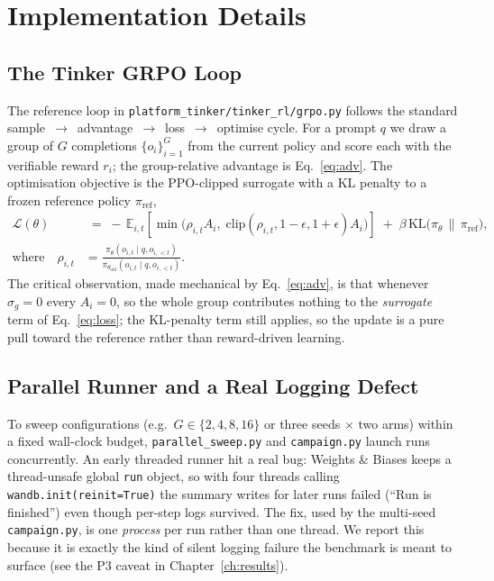 \chapter{Implementation Details}
\label{ch:impl}

\section{The Tinker GRPO Loop}
\label{sec:impl-loop}


The reference loop in \texttt{platform\_\-tinker/\allowbreak tinker\_\-rl/\allowbreak grpo.py} follows the standard
sample~$\rightarrow$~advantage~$\rightarrow$~loss~$\rightarrow$~optimise cycle. For a
prompt $q$ we draw a group of $G$ completions $\{o_i\}_{i=1}^{G}$ from the current
policy and score each with the verifiable reward $r_i$; the group-relative advantage
is Eq.~\eqref{eq:adv}. The optimisation objective is the PPO-clipped surrogate with
a KL penalty to a frozen reference policy $\pi_{\mathrm{ref}}$,
\begin{align}
\mathcal{L}(\theta) &\;=\;
-\,\mathbb{E}_{i,t}\!\left[
\min\!\big(\rho_{i,t}A_i,\;
\mathrm{clip}(\rho_{i,t},1-\epsilon,1+\epsilon)A_i\big)
\right]
\;+\; \beta\, \mathrm{KL}\!\big(\pi_\theta \,\|\, \pi_{\mathrm{ref}}\big),
\label{eq:loss}\\[0.2em]
\text{where}\quad
\rho_{i,t} &=\frac{\pi_\theta(o_{i,t}\mid q,o_{i,<t})}{\pi_{\theta_{\mathrm{old}}}(o_{i,t}\mid q,o_{i,<t})}.
\nonumber
\end{align}
The critical observation, made mechanical by Eq.~\eqref{eq:adv}, is that whenever
$\sigma_g = 0$ every $A_i = 0$, so the whole group contributes nothing to the
\emph{surrogate} term of Eq.~\eqref{eq:loss}; the KL-penalty term still applies, so
the update is a pure pull toward the reference rather than reward-driven learning.

\section{Parallel Runner and a Real Logging Defect}
\label{sec:runner}
To sweep configurations (e.g.\ $G \in \{2,4,8,16\}$ or three seeds $\times$ two arms)
within a fixed wall-clock budget, \texttt{parallel\_\-sweep.py} and \texttt{campaign.py}
launch runs concurrently. An early threaded runner hit a real bug: Weights \& Biases
keeps a thread-unsafe global \texttt{run} object, so with four threads calling
\texttt{wandb.init(reinit=True)} the summary writes for later runs failed (``Run is
finished'') even though per-step logs survived. The fix, used by the multi-seed
\texttt{campaign.py}, is one \emph{process} per run rather than one thread. We report
this because it is exactly the kind of silent logging failure the benchmark is meant
to surface (see the P3 caveat in Chapter~\ref{ch:results}).

